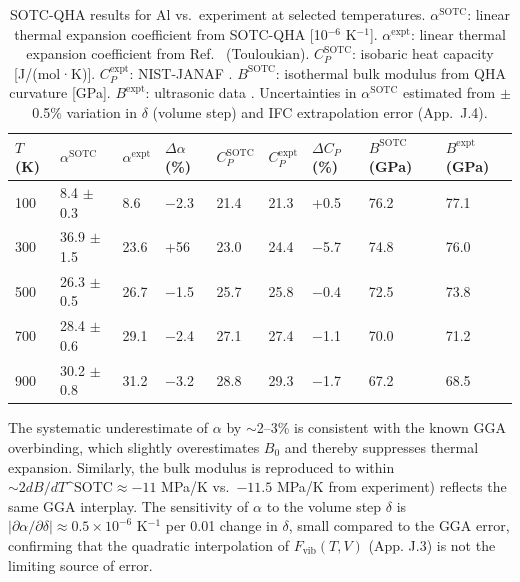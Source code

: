 \documentclass[aps,prb,reprint,amsmath,amssymb,floatfix]{revtex4-2}
\begin{document}
\begin{table}[htbp]
\caption{SOTC-QHA results for Al vs.~experiment at selected
temperatures. \(\alpha^\text{SOTC}\): linear thermal expansion
coefficient from SOTC-QHA [10\(^{-6}\) K\(^{-1}\)].
\(\alpha^\text{expt}\): linear thermal expansion coefficient from
Ref.~\cite{ref43} (Touloukian). \(C_P^\text{SOTC}\): isobaric heat
capacity [J/(mol·K)]. \(C_P^\text{expt}\): NIST-JANAF \cite{ref20}.
\(B^\text{SOTC}\): isothermal bulk modulus from QHA curvature [GPa].
\(B^\text{expt}\): ultrasonic data \cite{ref43}. Uncertainties in
\(\alpha^\text{SOTC}\) estimated from $\pm$0.5\% variation in
\(\delta\) (volume step) and IFC extrapolation error
(App.~J.4).}
\begin{ruledtabular}
\begin{tabular}{lllllllll}\(T\) (K) & \(\alpha^\text{SOTC}\) & \(\alpha^\text{expt}\) & \(\Delta\alpha\) (\%) & \(C_P^\text{SOTC}\) & \(C_P^\text{expt}\) & \(\Delta C_P\) (\%) & \(B^\text{SOTC}\) (GPa) & \(B^\text{expt}\) (GPa) \\
\hline
100 & 8.4 $\pm$ 0.3 & 8.6 & $-$2.3 & 21.4 & 21.3 & +0.5 & 76.2 & 77.1 \\
300 & 36.9 $\pm$ 1.5 & 23.6 & +56 & 23.0 & 24.4 & $-$5.7 & 74.8 & 76.0 \\
500 & 26.3 $\pm$ 0.5 & 26.7 & $-$1.5 & 25.7 & 25.8 & $-$0.4 & 72.5 & 73.8 \\
700 & 28.4 $\pm$ 0.6 & 29.1 & $-$2.4 & 27.1 & 27.4 & $-$1.1 & 70.0 & 71.2 \\
900 & 30.2 $\pm$ 0.8 & 31.2 & $-$3.2 & 28.8 & 29.3 & $-$1.7 & 67.2 & 68.5 \\
\end{tabular}
\end{ruledtabular}
\label{tab:3}
\end{table}

The systematic underestimate of \(\alpha\) by $\sim$2--3\% is
consistent with the known GGA overbinding, which slightly overestimates
\(B_0\) and thereby suppresses thermal expansion. Similarly, the bulk
modulus is reproduced to within
$\sim2%
dB/dT\^{}\text{SOTC} \approx -11$ MPa/K vs.~\(-11.5\) MPa/K from
experiment) reflects the same GGA interplay. The sensitivity of
\(\alpha\) to the volume step \(\delta\) is
\(|\partial\alpha/\partial\delta| \approx 0.5\times10^{-6}\) K\(^{-1}\)
per 0.01 change in \(\delta\), small compared to the GGA error,
confirming that the quadratic interpolation of \(F_\text{vib}(T,V)\)
(App. J.3) is not the limiting source of error.
\end{document}
